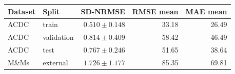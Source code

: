 \setcounter{table}{1}\label{tab:transition_aggregate_errors}
\begin{tabular}{llrrr}
\toprule
Dataset & Split & SD-NRMSE & RMSE mean & MAE mean \\
\midrule
ACDC & train & \(0.510\pm0.148\) & 33.18 & 26.49 \\
ACDC & validation & \(0.814\pm0.409\) & 58.42 & 46.49 \\
ACDC & test & \(0.767\pm0.246\) & 51.65 & 38.64 \\
M\&Ms & external & \(1.726\pm1.177\) & 85.35 & 69.81 \\
\bottomrule
\end{tabular}

